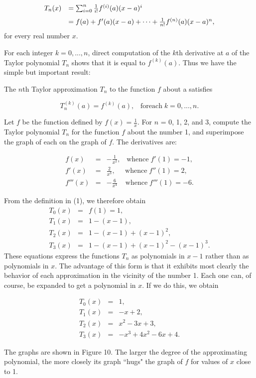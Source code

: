\begin{equation}
\begin{array}{ll}
T_n(x) &= \sum_{i=0}^n \frac{1}{i!} f^{(i)}(a)(x-a)^i \vspace{.1in}\\ 
           &= f(a) + f'(a)(x-a) + \cdots + \frac{1}{n!} f^{(n)}(a)(x-a)^n ,   
\end{array}
\label{eq9.8.1}
\end{equation}
\noindent for every real number $x$.

For each integer $k = 0, . . ., n$, direct computation of the $k$th derivative at $a$ of the Taylor polynomial $T_n$ shows that it is equal to $f^{(k)}(a)$. Thus we have the simple but important result:

\begin{theorem}  The $n$th Taylor approximation  $T_n$ to the function $f$ about a satisfies 

$$
T_n^{(k)}(a) = f^{(k)}(a), \;\;\;\mathrm{for each}\; k = 0, . . ., n. 
$$
\end{theorem}
\begin{example}
Let $f$ be the function defined by $f(x) = \frac{1}{x}$. For $n$ = 0, 1, 2,
and 3, compute the Taylor polynomial $T_n$ for the function $f$ about the number 1, and superimpose the graph of each on the graph of $f$. The derivatives are:

\begin{eqnarray*}
f (x) &=& -\frac{1}{x^2}, \;\;\;\mbox{whence}\; f'(1) = -1, \\
f' (x) &=& \frac{2}{x^3},  \;\;\;\;\;\mbox{whence}\; f''(1)= 2,  \\
f''' (x) &=& -\frac{6}{x^4} \;\;\;\;\mbox{whence}\; f'''(1) = - 6.
\end{eqnarray*}

\noindent From the definition in (1), we therefore obtain 
\begin{eqnarray*}
T_0(x) &=& f(1) = 1, \\
T_1(x) &=& 1 - (x - 1), \\
T_2(x) &=& 1 - (x - 1) + (x - 1)^2, \\
T_3(x) &=& 1 - (x - 1) + (x - 1)^2 - (x - 1)^3.
\end{eqnarray*}
\noindent These equations express the functions $T_n$ as polynomials in $x - 1$ rather than as polynomials in $x$. The advantage of this form is that it exhibits most clearly the behavior of each approximation in the vicinity of the number 1. Each one can, of course, be expanded to get a polynomial in $x$. If we do this, we obtain

\begin{eqnarray*}
T_0(x) &=& 1, \\
T_1(x) &=& -x + 2, \\
T_2(x) &=& x^2 - 3x + 3,\\
T_3(x) &=& -x^3 + 4x^2 - 6x + 4.
\end{eqnarray*}

\noindent The graphs are shown in Figure 10. The larger the degree of the approximating polynomial, the more closely its graph ``hugs" the graph of $f$ for values of $x$ close to 1.
\end{example}

